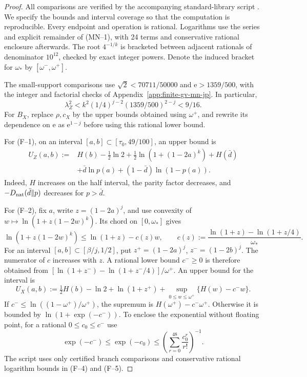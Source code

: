 \documentclass[11pt]{article}
\theoremstyle{definition}
\begin{document}
\begin{proof}
All comparisons are verified by the accompanying standard-library script
. We specify the bounds and interval
coverage so that the computation is reproducible. Every endpoint and
operation is rational. Logarithms use the series and explicit remainder
of (MN--1), with 24 terms and conservative rational enclosure afterwards.
The root \(4^{-1/k}\) is bracketed between adjacent rationals of denominator
\(10^{12}\), checked by exact integer powers. Denote the induced bracket
for \(\omega_*\) by \([\omega^-,\omega^+]\).

The small-support comparisons use \(\sqrt2<70711/50000\) and
\(\mathrm e>1359/500\), with the integer and factorial checks of
Appendix~\ref{app:finite-gv-mn-jp}. In particular,
\[
\lambda_Z^2< k^2(1/4)^{j-2}(1359/500)^{2-j}<9/16.
\]
For \(B_X\), replace \(\rho,c_X\) by the upper bounds obtained using
\(\omega^+\), and rewrite its dependence on \(\mathrm e\) as
\(\mathrm e^{1-j}\) before using this rational lower bound.

For (F--1), on an interval \([a,b]\subset[\tau_0,49/100]\), an upper
bound is
\[
\begin{split}
U_Z(a,b):={}&H(b)-\tfrac12\ln2+
\tfrac12\ln(1+(1-2a)^k)+H(\bar d)\\
&+\bar d\ln p(a)+(1-\bar d)\ln(1-p(a)).
\end{split}                                            \tag{F--4}
\]
Indeed, \(H\) increases on the half interval, the parity factor decreases,
and \(-D_{\rm nat}(\bar d\|p)\) decreases for \(p>\bar d\).

For (F--2), fix \(a\), write \(z=(1-2a)^j\), and use convexity of
\(w\mapsto\ln(1+z(1-2w)^k)\). Its chord on \([0,\omega_*]\) gives
\[
\ln(1+z(1-2w)^k)\le\ln(1+z)-c(z)w,\qquad
c(z):=\frac{\ln(1+z)-\ln(1+z/4)}{\omega_*}.
\]
For an interval \([a,b]\subset[\beta/j,1/2]\), put
\(z^+=(1-2a)^j\), \(z^-=(1-2b)^j\).
The numerator of \(c\) increases with \(z\). A rational lower bound
\(c^-\ge0\) is therefore obtained from
\([\ln(1+z^-)-\ln(1+z^-/4)]/\omega^+\).
An upper bound for the interval is
\[
U_X(a,b):=\tfrac12 H(b)-\ln2+\ln(1+z^+)
+\sup_{0\le w\le\omega^+}\{H(w)-c^-w\}.                \tag{F--5}
\]
If \(c^-\le\ln((1-\omega^+)/\omega^+)\), the supremum is
\(H(\omega^+)-c^-\omega^+\). Otherwise it is bounded by
\(\ln(1+\exp(-c^-))\). To enclose the exponential without floating
point, for a rational \(0\le c_0\le c^-\) use
\[
\exp(-c^-)\le\exp(-c_0)
\le\left(\sum_{r=0}^{48}\frac{c_0^r}{r!}\right)^{-1}.
\]
The script uses only certified branch comparisons and conservative
rational logarithm bounds in (F--4) and (F--5).


\end{proof}
\end{document}
